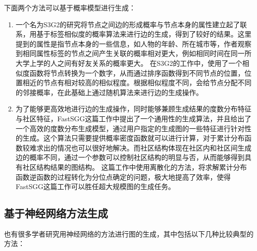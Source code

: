 下面两个方法可以基于概率模型进行生成：

\begin{enumerate}
  \item 一个名为S3G2\cite{Minh2012S3G2}的研究将节点之间边的形成概率与节点本身的属性建立起了联系，用基于标签相似度的概率算法来进行边的生成，得到了较好的结果。这里提到的属性是指节点本身的一些信息，如人物的年龄、所在城市等，作者观察到相同属性标签的节点之间产生关联的概率相对更大，例如相同时间在同一所大学上学的人之间有好友关系的概率更大。
  在S3G2的工作中，使用了一个相似度函数将节点转换为一个数字，从而通过排序函数得到不同节点的位置，位置相近的节点有相对较高的相似程度。根据相似程度不同，会给节点分配不同的邻接概率，在此基础上通过随机算法来进行边的生成操作。
  \item 为了能够更高效地进行边的生成操作，同时能够兼顾生成结果的度数分布特征与社区特征，FastSGG\cite{FastSGG}这篇工作中提出了一个通用性的生成算法，并且给出了一个高效的度数分布生成模型，通过用户指定的生成图的一些特征进行针对性的生成。这个算法只需要提供概率密度函数就可以进行计算，对于累计分布函数较难求出的情况也可以很好地解决。而社区结构体现在社区内和社区间生成边的概率不同，通过一个参数可以控制社区结构的明显与否，从而能够得到具有社区结构结果的图结构。
  这篇工作中使用离散化的方法，将求解累计分布函数逆函数的过程转化为分位点确定的问题，极大地提高了效率，使得FastSGG这篇工作可以胜任超大规模图的生成任务。
\end{enumerate}

\vspace{0.2cm}

\subsection{基于神经网络方法生成}

也有很多学者研究用神经网络的方法进行图的生成，其中包括以下几种比较典型的方法：


